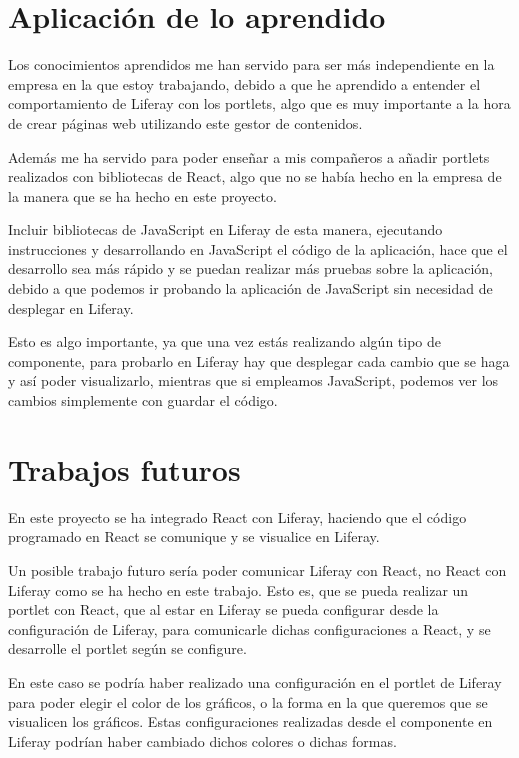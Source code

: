 \documentclass[a4paper, 12pt]{book}
\begin{document}
\section{Aplicación de lo aprendido}
\label{sec:aprendido}
Los conocimientos aprendidos me han servido para ser más independiente en la empresa en la que estoy trabajando, debido a que he aprendido a entender el comportamiento de Liferay con los portlets, algo que es muy importante a la hora de crear páginas web utilizando este gestor de contenidos.

\vspace{5mm}
Además me ha servido para poder enseñar a mis compañeros a añadir portlets realizados con bibliotecas de React, algo que no se había hecho en la empresa de la manera que se ha hecho en este proyecto. 

Incluir bibliotecas de JavaScript en Liferay de esta manera, ejecutando instrucciones y desarrollando en JavaScript el código de la aplicación, hace que el desarrollo sea más rápido y se puedan realizar más pruebas sobre la aplicación, debido a que podemos ir probando la aplicación de JavaScript sin necesidad de desplegar en Liferay.

Esto es algo importante, ya que una vez estás realizando algún tipo de componente, para probarlo en Liferay hay que desplegar cada cambio que se haga y así poder visualizarlo, mientras que si empleamos JavaScript, podemos ver los cambios simplemente con guardar el código.

 
\section{Trabajos futuros}
\label{sec:trabajos_futuros}
En este proyecto se ha integrado React con Liferay, haciendo que el código programado en React se comunique y se visualice en Liferay.

Un posible trabajo futuro sería poder comunicar Liferay con React, no React con Liferay como se ha hecho en este trabajo. Esto es, que se pueda realizar un portlet con React, que al estar en Liferay se pueda configurar desde la configuración de Liferay, para comunicarle dichas configuraciones a React, y se desarrolle el portlet según se configure.

En este caso se podría haber realizado una configuración en el portlet de Liferay para poder elegir el color de los gráficos, o la forma en la que queremos que se visualicen los gráficos. Estas configuraciones realizadas desde el componente en Liferay podrían haber cambiado dichos colores o dichas formas.
\end{document}
